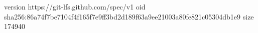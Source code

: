 version https://git-lfs.github.com/spec/v1
oid sha256:86a74f7be7104f4f165f7e9ff3bd2d189f63a9ee21003a80fe821c05304db1e9
size 174940
